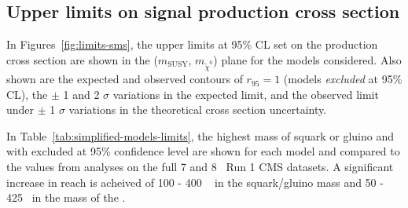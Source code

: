 \subsection{Upper limits on signal production cross section}

In Figures~\ref{fig:limits-sms}, the upper limits at 95\% CL set on the production cross section are shown
in the ($m_{\text{SUSY}}$, $m_{\tilde{\chi}^{0}}$) plane for the models considered.
Also shown are the expected and observed contours of $r_{95} = 1$ (models \emph{excluded}
at 95\% CL), the $\pm$ 1 and 2
$\sigma$ variations in the expected limit, and the observed limit under $\pm$ 1 $\sigma$ 
variations in the theoretical cross section uncertainty.

In Table~\ref{tab:simplified-models-limits}, the highest mass of squark or gluino and \chiz 
with excluded at 95\% confidence level are shown for each model 
and compared to the values from analyses on the full 
7 and 8 \TeV ~Run 1 CMS datasets. A significant increase in reach is acheived of 100 - 400 \GeV ~
in the squark/gluino mass and 50 - 425 \GeV ~in the mass of the \chiz.
